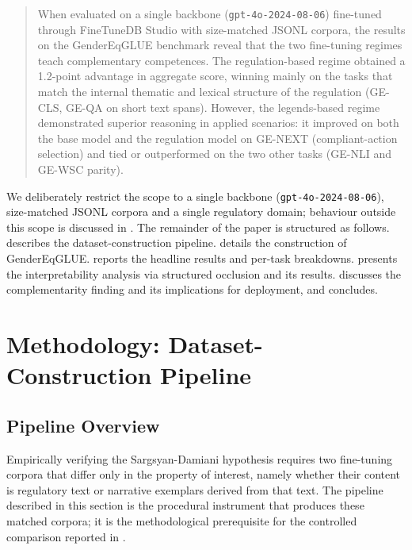 \documentclass[pdflatex, sn-apa]{sn-jnl}%
\theoremstyle{thmstyleone}%
\theoremstyle{thmstyletwo}%
\theoremstyle{thmstylethree}%
\begin{document}
\begin{quote}
When evaluated on a single backbone (\texttt{gpt-4o-2024-08-06}) fine-tuned
through FineTuneDB Studio with size-matched JSONL corpora, the results on the
GenderEqGLUE benchmark reveal that the two fine-tuning regimes teach
complementary competences. The regulation-based regime obtained a 1.2-point
advantage in aggregate score, winning mainly on the tasks that match the internal
thematic and lexical structure of the regulation (GE-CLS, GE-QA on short text
spans). However, the legends-based regime demonstrated superior reasoning in
applied scenarios: it improved on both the base model and the regulation model on
GE-NEXT (compliant-action selection) and tied or outperformed on the two other
tasks (GE-NLI and GE-WSC parity).
\end{quote}
 
We deliberately restrict the scope to a single backbone
(\texttt{gpt-4o-2024-08-06}), size-matched JSONL corpora and a single regulatory
domain; behaviour outside this scope is discussed in
. The remainder of the paper is structured as follows.
 describes the dataset-construction pipeline.
 details the construction of GenderEqGLUE.
 reports the headline results and per-task breakdowns.
 presents the interpretability analysis via structured occlusion
and its results.  discusses the complementarity finding and
its implications for deployment, and  concludes.
\section{Methodology: Dataset-Construction Pipeline}
\label{sec:method}

\subsection{Pipeline Overview}
\label{sec:method:overview}

Empirically verifying the Sargsyan-Damiani hypothesis requires two fine-tuning
corpora that differ only in the property of interest, namely whether their
content is regulatory text or narrative exemplars derived from that text. The
pipeline described in this section is the procedural instrument that produces
these matched corpora; it is the methodological prerequisite for the controlled
comparison reported in .
\end{document}
